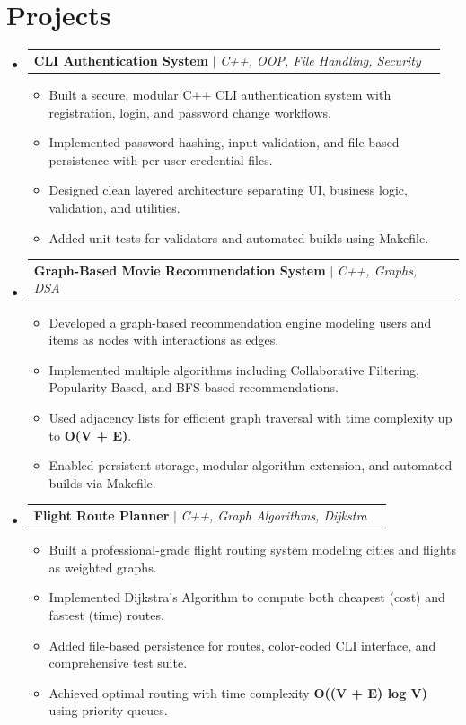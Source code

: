\documentclass[letterpaper,11pt]{article}
\makeatletter
\newcommand{\resumeItem}[1]{\item\small{{#1 \vspace{-2pt}}}}
\newcommand{\resumeProjectHeading}[2]{
    \item
    \begin{tabular*}{1.001\textwidth}{l@{\extracolsep{\fill}}r}
      \small#1 & \textbf{\small #2}\\
    \end{tabular*}\vspace{-6pt}
}
\newcommand{\resumeItemListStart}{\begin{itemize}}
\newcommand{\resumeItemListEnd}{\end{itemize}\vspace{-5pt}}
\newcommand{\resumeSubHeadingListStart}{\begin{itemize}[leftmargin=0.0in, label={}]}
\newcommand{\resumeSubHeadingListEnd}{\end{itemize}}
\makeatother
\begin{document}
\section{Projects}
\resumeSubHeadingListStart
\resumeProjectHeading
{\textbf{CLI Authentication System} $|$ \emph{C++, OOP, File Handling, Security}}{\href{https://github.com/deeplukhi/cli-authentication-cpp}{\faGithub}}
\resumeItemListStart
\resumeItem{Built a secure, modular C++ CLI authentication system with registration, login, and password change workflows.}
\resumeItem{Implemented password hashing, input validation, and file-based persistence with per-user credential files.}
\resumeItem{Designed clean layered architecture separating UI, business logic, validation, and utilities.}
\resumeItem{Added unit tests for validators and automated builds using Makefile.}
\resumeItemListEnd
\resumeProjectHeading
{\textbf{Graph-Based Movie Recommendation System} $|$ \emph{C++, Graphs, DSA}}{\href{https://github.com/deeplukhi/Social-Recommendation-Engine}{\faGithub}}
\resumeItemListStart
\resumeItem{Developed a graph-based recommendation engine modeling users and items as nodes with interactions as edges.}
\resumeItem{Implemented multiple algorithms including Collaborative Filtering, Popularity-Based, and BFS-based recommendations.}
\resumeItem{Used adjacency lists for efficient graph traversal with time complexity up to \textbf{O(V + E)}.}
\resumeItem{Enabled persistent storage, modular algorithm extension, and automated builds via Makefile.}
\resumeItemListEnd
\resumeProjectHeading
{\textbf{Flight Route Planner} $|$ \emph{C++, Graph Algorithms, Dijkstra}}{\href{https://github.com/deeplukhi/FlightRoutePlanner}{\faGithub}}
\resumeItemListStart
\resumeItem{Built a professional-grade flight routing system modeling cities and flights as weighted graphs.}
\resumeItem{Implemented Dijkstra’s Algorithm to compute both cheapest (cost) and fastest (time) routes.}
\resumeItem{Added file-based persistence for routes, color-coded CLI interface, and comprehensive test suite.}
\resumeItem{Achieved optimal routing with time complexity \textbf{O((V + E) log V)} using priority queues.}
\resumeItemListEnd
\resumeSubHeadingListEnd

\end{document}

